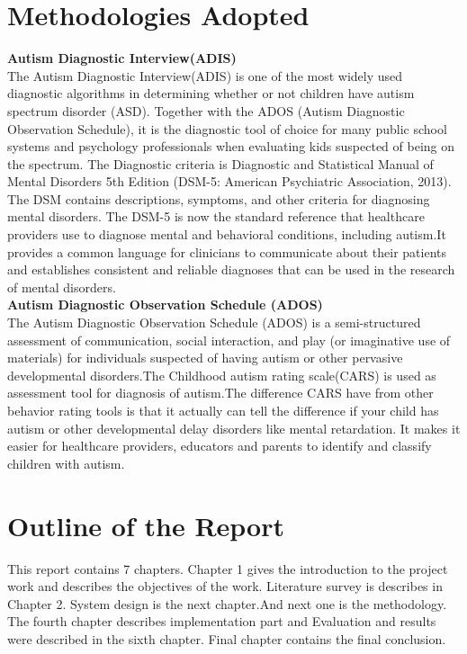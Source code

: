 \section{Methodologies Adopted}
\textbf{Autism Diagnostic Interview(ADIS)}\\
The Autism Diagnostic Interview(ADIS) is one of the most widely used diagnostic algorithms in determining whether or not children have autism spectrum disorder (ASD). Together with the ADOS (Autism Diagnostic Observation Schedule), it is the diagnostic tool of choice for many public school systems and psychology professionals when evaluating kids suspected of being on the spectrum. The Diagnostic criteria is Diagnostic and Statistical Manual of Mental Disorders 5th Edition (DSM-5: American Psychiatric Association, 2013).\\
The DSM contains descriptions, symptoms, and other criteria for diagnosing mental disorders. The DSM-5 is now the standard reference that healthcare providers use to diagnose mental and behavioral conditions, including autism.It provides a common language for clinicians to communicate about their patients and establishes consistent and reliable diagnoses that can be used in the research of mental disorders.\\

\textbf{Autism Diagnostic Observation Schedule (ADOS)}\\
The Autism Diagnostic Observation Schedule (ADOS) is a semi-structured assessment of communication, social interaction, and play (or imaginative use of materials) for individuals suspected of having autism or other pervasive developmental disorders.The Childhood autism rating scale(CARS) is used as assessment tool for diagnosis of autism.The difference CARS have from other behavior rating tools is that it actually can tell the difference if your child has autism or other developmental delay disorders like mental retardation. It makes it easier for healthcare providers, educators and parents to identify and classify children with autism.\\
\section{Outline of the Report}

This report contains 7 chapters. Chapter 1 gives the introduction to the project work and describes the objectives of the work. Literature survey is describes in Chapter 2. System design is the next chapter.And next one is the methodology. The fourth chapter describes implementation part and Evaluation and results were described in the sixth chapter. Final chapter contains the final conclusion.


